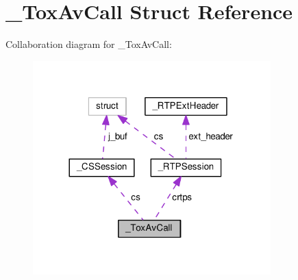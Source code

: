 \hypertarget{struct___tox_av_call}{\section{\+\_\+\+Tox\+Av\+Call Struct Reference}
\label{struct___tox_av_call}
}


Collaboration diagram for \+\_\+\+Tox\+Av\+Call\+:\nopagebreak
\begin{figure}[H]
\begin{center}
\leavevmode
\includegraphics[width=260pt]{struct___tox_av_call__coll__graph}
\end{center}
\end{figure}
